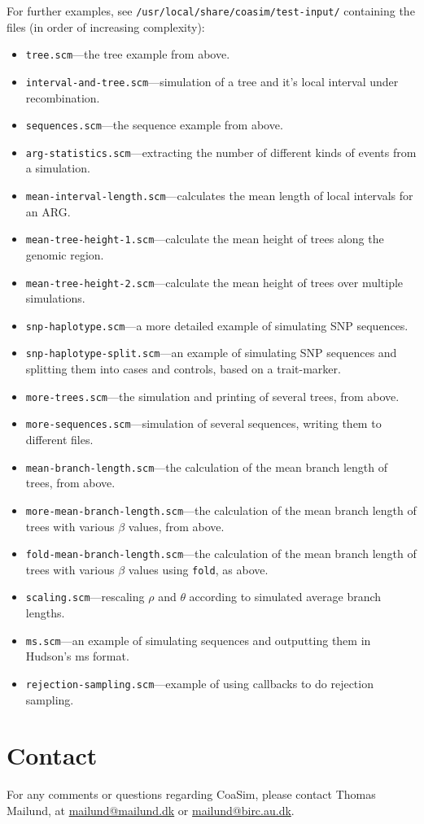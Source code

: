 \documentclass{manual}
\begin{document}
For further examples, see \verb?/usr/local/share/coasim/test-input/?
containing the files (in order of increasing complexity):
\begin{itemize}
\item \texttt{tree.scm}---the tree example from above.
\item \texttt{interval-and-tree.scm}---simulation of a tree and it's
  local interval under recombination.
\item \texttt{sequences.scm}---the sequence example from above.
\item \texttt{arg-statistics.scm}---extracting the number of different
  kinds of events from a simulation.
\item \texttt{mean-interval-length.scm}---calculates the mean length
  of local intervals for an ARG.
\item \texttt{mean-tree-height-1.scm}---calculate the mean height of
  trees along the genomic region.
\item \texttt{mean-tree-height-2.scm}---calculate the mean height of
  trees over multiple simulations.
\item \texttt{snp-haplotype.scm}---a more detailed example of
  simulating SNP sequences.
\item \texttt{snp-haplotype-split.scm}---an example of
  simulating SNP sequences and splitting them into cases and controls,
  based on a trait-marker.
\item \texttt{more-trees.scm}---the simulation and printing of several
  trees, from above.
\item \texttt{more-sequences.scm}---simulation of several sequences,
  writing them to different files.
\item \texttt{mean-branch-length.scm}---the calculation of the mean branch
  length of trees, from above.
\item \texttt{more-mean-branch-length.scm}---the calculation of the mean branch
  length of trees with various $\beta$ values, from above.
\item \texttt{fold-mean-branch-length.scm}---the calculation of the mean branch
  length of trees with various $\beta$ values using \texttt{fold}, as
  above.
\item \texttt{scaling.scm}---rescaling $\rho$ and $\theta$ according
  to simulated average branch lengths.
\item \texttt{ms.scm}---an example of simulating sequences and
  outputting them in Hudson's ms format.
\item \texttt{rejection-sampling.scm}---example of using callbacks to
  do rejection sampling.
\end{itemize}

\section{Contact}
\label{sec:contact}

For any comments or questions regarding CoaSim, please contact Thomas
Mailund, at \href{mailto:mailund@mailund.dk}{mailund@mailund.dk} or
\href{mailund@birc.au.dk}{mailund@birc.au.dk}.
\end{document}
